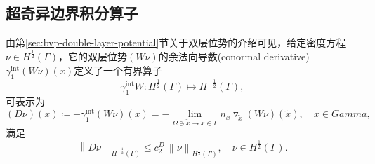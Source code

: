 \subsection{超奇异边界积分算子}
\label{sec:bvp-hyperbie-operator}

由第\ref{sec:bvp-double-layer-potential}节关于双层位势的介绍可见，给定密度方程$\nu \in H^{\frac{1}{2}}(\Gamma)$，它的双层位势$\left( W \nu \right)$的余法向导数(conormal derivative)$\gamma_{1}^{\text{int}}\left( W \nu \right)(x)$定义了一个有界算子
\begin{equation*}
  \gamma_{1}^{\text{int}} W : H^{\frac{1}{2}}(\Gamma) \mapsto H^{- \frac{1}{2}}(\Gamma),
\end{equation*}
可表示为
\begin{equation}
  \label{eq:bvp-hypersingular-bie-def}
  \left( D \nu \right)(x) \coloneqq - \gamma_{1}^{\text{int}}\left( W \nu \right)(x)
  = - \lim_{\Omega \ni \widetilde{x} \rightarrow x \in \Gamma}
  n_x \triangledown_{\widetilde{x}} \left( W \nu \right)(\widetilde{x}), \quad x \in Gamma,
\end{equation}
满足
\begin{equation}
  \label{eq:bvp-hypersingular-bie-norm}
  \left\| D \nu \right\|_{H^{-\frac{1}{2}}(\Gamma)}
  \le c_2^{D} \, \left\| \nu \right\|_{H^{\frac{1}{2}}(\Gamma)}, \quad \nu \in H^{\frac{1}{2}}(\Gamma).
\end{equation}


